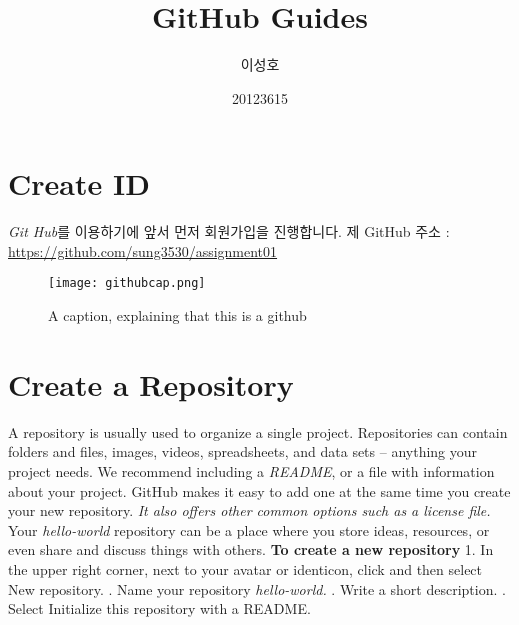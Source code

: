\documentclass[11pt]{report}
\author{이성호}
\date{20123615}
\title{GitHub Guides}
\begin{document}
\maketitle
\chapter{Create ID}
\textsl{Git Hub}를 이용하기에 앞서 먼저 회원가입을 진행합니다.
\newline
\newline
\newline 제 GitHub 주소 : 
\url{https://github.com/sung3530/assignment01}
\begin{figure}
\centering
\texttt{[image: githubcap.png]}
\caption{A caption, explaining that this is a github}
\end{figure}
\chapter{Create a Repository}
A repository is usually used to organize a single project. Repositories can contain folders and files, images, videos, spreadsheets, and data sets – anything your project needs. We recommend including a \textsl{README}, or a file with information about your project. GitHub makes it easy to add one at the same time you create your new repository. \textsl{It also offers other common options such as a license file.}
\newline
\newline Your \textsl{hello-world} repository can be a place where you store ideas, resources, or even share and discuss things with others.
\newline
\newline \textbf {\LARGE To create a new repository}
\newline
\newline \small 1. In the upper right corner, next to your avatar or identicon, click  and then select New repository.
\newline
{}. Name your repository \textsl{hello-world.}
\newline
{}. Write a short description.
\newline
{}. Select Initialize this repository with a README.
\end{document}
